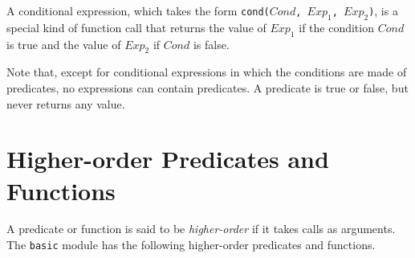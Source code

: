 A conditional expression, which takes the form \texttt{cond($Cond$, $Exp_1$, $Exp_2$)}, is a special kind of function call that returns the value of $Exp_1$ if the condition $Cond$ is true and the value of $Exp_2$ if $Cond$ is false.

Note that, except for conditional expressions in which the conditions are made of predicates, no expressions can contain predicates. A predicate is true or false, but never returns any value.


\section{Higher-order Predicates and Functions}
A predicate or function is said to be \emph{higher-order} if it takes calls as arguments. The \texttt{basic} module has the following higher-order predicates and functions.

